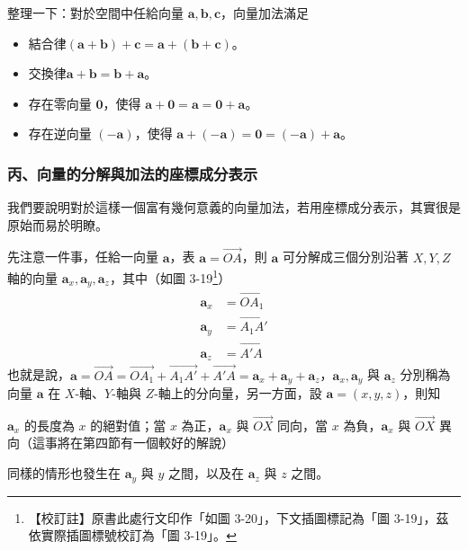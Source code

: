 整理一下：對於空間中任給向量 $\mathbf{a}, \mathbf{b}, \mathbf{c}$，向量加法滿足
\begin{itemize}[leftmargin=3em]
  \item[(I)] 結合律\quad $(\mathbf{a} + \mathbf{b}) + \mathbf{c} = \mathbf{a} + (\mathbf{b} + \mathbf{c})$。
  \item[(II)] 交換律\quad $\mathbf{a} + \mathbf{b} = \mathbf{b} + \mathbf{a}$。
  \item[(III)] 存在零向量 $\mathbf{0}$，使得 $\mathbf{a} + \mathbf{0} = \mathbf{a} = \mathbf{0} + \mathbf{a}$。
  \item[(IV)] 存在逆向量 $(-\mathbf{a})$，使得 $\mathbf{a} + (-\mathbf{a}) = \mathbf{0} = (-\mathbf{a}) + \mathbf{a}$。
\end{itemize}

\subsubsection*{丙、向量的分解與加法的座標成分表示}

我們要說明對於這樣一個富有幾何意義的向量加法，若用座標成分表示，其實很是原始而易於明瞭。

\label{note:b3s-ch3-p87-fig-ref}%
先注意一件事，任給一向量 $\mathbf{a}$，表 $\mathbf{a} = \vec{OA}$，則 $\mathbf{a}$ 可分解成三個分別沿著 $X, Y, Z$ 軸的向量 $\mathbf{a}_x, \mathbf{a}_y, \mathbf{a}_z$，其中（如圖 3-19\footnote{【校訂註】原書此處行文印作「如圖 3-20」，下文插圖標記為「圖 3-19」，茲依實際插圖標號校訂為「圖 3-19」。}）
\begin{align*}
\mathbf{a}_x &= \vec{OA_1} \\
\mathbf{a}_y &= \vec{A_1 A'} \\
\mathbf{a}_z &= \vec{A'A}
\end{align*}
也就是說，$\mathbf{a} = \vec{OA} = \vec{OA_1} + \vec{A_1 A'} + \vec{A'A} = \mathbf{a}_x + \mathbf{a}_y + \mathbf{a}_z$，$\mathbf{a}_x, \mathbf{a}_y$ 與 $\mathbf{a}_z$ 分別稱為向量 $\mathbf{a}$ 在 $X$-軸、$Y$-軸與 $Z$-軸上的分向量，另一方面，設 $\mathbf{a} = (x, y, z)$，則知
\begin{center}
$\mathbf{a}_x$ 的長度為 $x$ 的絕對值；當 $x$ 為正，$\mathbf{a}_x$ 與 $\vec{OX}$ 同向，當 $x$ 為負，$\mathbf{a}_x$ 與 $\vec{OX}$ 異向（這事將在第四節有一個較好的解說）
\end{center}
同樣的情形也發生在 $\mathbf{a}_y$ 與 $y$ 之間，以及在 $\mathbf{a}_z$ 與 $z$ 之間。

